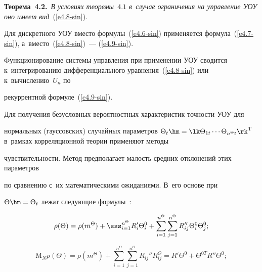 \smallskip



\noindent

\textbf{Теорема~4.2.}\ \textit{В условиях теоремы~$4.1$ в~случае ограничения на управление УОУ оно имеет вид}~(\ref{e4.8-sin}).



\smallskip



Для дискретного УОУ вместо формулы~(\ref{e4.6-sin}) применяется формула~(\ref{e4.7-sin}), а~вместо~(\ref{e4.8-sin})~--- (\ref{e4.9-sin}). 

Функционирование сис\-те\-мы управления при применении УОУ сводится к~интегрированию дифференциального уравнения~(\ref{e4.8-sin}) или к~вычислению~$U_n$ по 

рекуррентной формуле~(\ref{e4.9-sin}).



Для получения безусловных вероятностных характеристик точности УОУ для 

нормальных (гауссовских) случайных параметров  $\Theta_t \hm=\lk \Theta_{1t} \cdots 

\Theta_{n^\Theta t}\rk^{\mathrm{T}}$ в~рамках корреляционной теории применяют методы 

чувствительности. Метод предполагает малость средних отклонений этих параметров 

по сравнению с~их математическими ожиданиями. В~его основе  при  

$\Theta\hm=\Theta_t$ лежат следующие формулы~\cite{15-sin}:

\begin{equation*}

\rho(\Theta) =\rho(m^\Theta) + \sss_{i=1}^{n^\Theta} R_i' \Theta_i^0+ 

\sum\limits_{i=1}^{n^\Theta} \sum\limits_{j=1}^{n^\Theta} R_{ij}'' \Theta_i^0 \Theta_j^0; %

\end{equation*}

\begin{equation}

\mathrm{M}_N \rho(\Theta) = \rho(m^\Theta) +\sum\limits_{i=1}^{n^\Theta} \sum\limits_{j=1}^{n^\Theta} R_{ij}'' 

R_{ij}^\Theta = R'\Theta^0 + \Theta^{0T} R'' \Theta^0;\label{e4.12-sin}

\end{equation}



